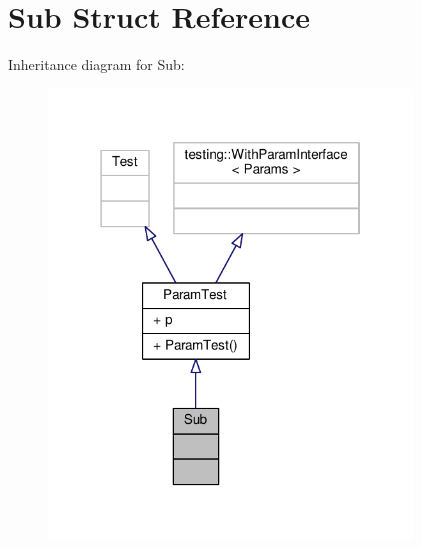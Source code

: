 \hypertarget{struct_sub}{}\section{Sub Struct Reference}
\label{struct_sub}


Inheritance diagram for Sub\+:
\nopagebreak
\begin{figure}[H]
\begin{center}
\leavevmode
\includegraphics[width=274pt]{struct_sub__inherit__graph}
\end{center}
\end{figure}



